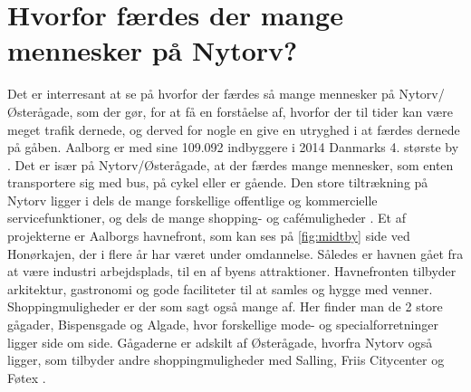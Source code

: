 \section{Hvorfor færdes der mange mennesker på Nytorv?}
\label{sec:hvorfor_faerdes_der_mange_mennesker_paa_nytorv?}
Det er interresant at se på hvorfor der færdes så mange mennesker på Nytorv/Østerågade, som der gør, for at få en forståelse af, hvorfor der til tider kan være meget trafik dernede, og derved for nogle en give en utryghed i at færdes dernede på gåben.
Aalborg er med sine 109.092 indbyggere i 2014 Danmarks 4. største by \autocite{bystorelse}.%
Det er især på Nytorv/Østerågade, at der færdes mange mennesker, som enten transportere sig med bus, på cykel eller er gående. Den store tiltrækning på Nytorv ligger i dels de mange forskellige offentlige og kommercielle servicefunktioner, og dels de mange shopping- og cafémuligheder \autocite{attraktiv}. 
Et af projekterne er Aalborgs havnefront, som kan ses på \cref{fig:midtby} side \pageref{fig:midtby} ved Honørkajen, der i flere år har været under omdannelse. Således er havnen gået fra at være industri arbejdsplads, til en af byens attraktioner. Havnefronten tilbyder arkitektur, gastronomi og gode faciliteter til at samles og hygge med venner.
Shoppingmuligheder er der som sagt også mange af. Her finder man de 2 store gågader, Bispensgade og Algade, hvor forskellige mode- og specialforretninger ligger side om side. Gågaderne er adskilt af Østerågade, hvorfra Nytorv også ligger, som tilbyder andre shoppingmuligheder med Salling, Friis Citycenter og Føtex \autocite{shopping}.
